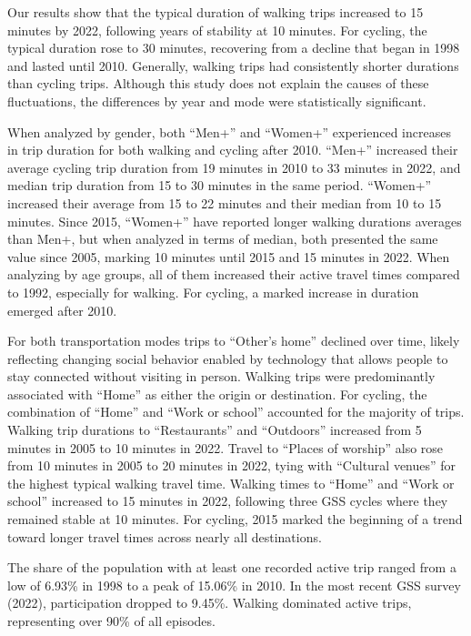 \documentclass[preprint, 3p,
authoryear]{elsarticle} %
\begin{document}
Our results show that the typical duration of walking trips increased to
15 minutes by 2022, following years of stability at 10 minutes. For
cycling, the typical duration rose to 30 minutes, recovering from a
decline that began in 1998 and lasted until 2010. Generally, walking
trips had consistently shorter durations than cycling trips. Although
this study does not explain the causes of these fluctuations, the
differences by year and mode were statistically significant.

When analyzed by gender, both ``Men+'' and ``Women+'' experienced
increases in trip duration for both walking and cycling after 2010.
``Men+'' increased their average cycling trip duration from 19 minutes
in 2010 to 33 minutes in 2022, and median trip duration from 15 to 30
minutes in the same period. ``Women+'' increased their average from 15
to 22 minutes and their median from 10 to 15 minutes. Since 2015,
``Women+'' have reported longer walking durations averages than Men+,
but when analyzed in terms of median, both presented the same value
since 2005, marking 10 minutes until 2015 and 15 minutes in 2022. When
analyzing by age groups, all of them increased their active travel times
compared to 1992, especially for walking. For cycling, a marked increase
in duration emerged after 2010.

For both transportation modes trips to ``Other's home'' declined over
time, likely reflecting changing social behavior enabled by technology
that allows people to stay connected without visiting in person. Walking
trips were predominantly associated with ``Home'' as either the origin
or destination. For cycling, the combination of ``Home'' and ``Work or
school'' accounted for the majority of trips. Walking trip durations to
``Restaurants'' and ``Outdoors'' increased from 5 minutes in 2005 to 10
minutes in 2022. Travel to ``Places of worship'' also rose from 10
minutes in 2005 to 20 minutes in 2022, tying with ``Cultural venues''
for the highest typical walking travel time. Walking times to ``Home''
and ``Work or school'' increased to 15 minutes in 2022, following three
GSS cycles where they remained stable at 10 minutes. For cycling, 2015
marked the beginning of a trend toward longer travel times across nearly
all destinations.

The share of the population with at least one recorded active trip
ranged from a low of 6.93\% in 1998 to a peak of 15.06\% in 2010. In the
most recent GSS survey (2022), participation dropped to 9.45\%. Walking
dominated active trips, representing over 90\% of all episodes.
\end{document}
